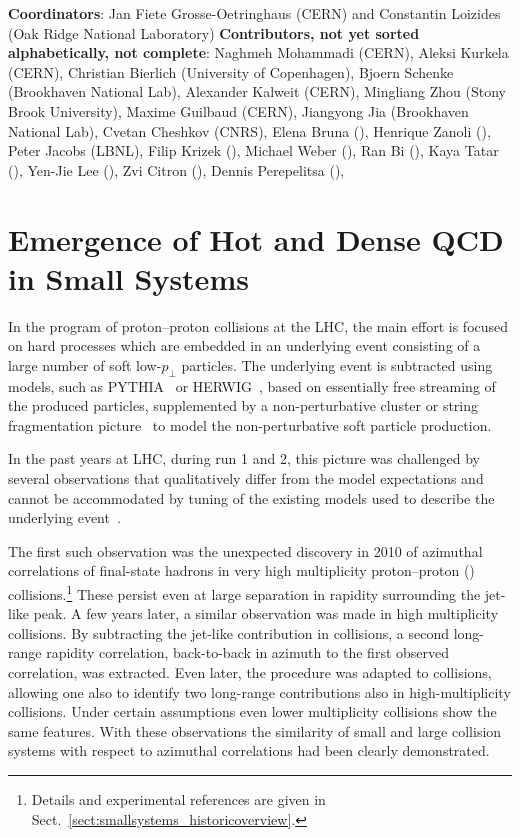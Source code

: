 \documentclass[../report.tex]{subfiles}
\begin{document}
\textbf{Coordinators}: Jan Fiete Grosse-Oetringhaus (CERN) and Constantin Loizides (Oak Ridge National Laboratory)
\linebreak
\textbf{Contributors, not yet sorted alphabetically, not complete}:
Naghmeh Mohammadi (CERN),
Aleksi Kurkela (CERN),
Christian Bierlich (University of Copenhagen),
Bjoern Schenke (Brookhaven National Lab),
Alexander Kalweit (CERN),
Mingliang Zhou (Stony Brook University),
Maxime Guilbaud (CERN),
Jiangyong Jia (Brookhaven National Lab),
Cvetan Cheshkov (CNRS),
Elena Bruna (),
Henrique Zanoli (),
Peter Jacobs (LBNL),
Filip Krizek (),
Michael Weber (),
Ran Bi (),
Kaya Tatar (),
Yen-Jie Lee (),
Zvi Citron (),
Dennis Perepelitsa (),

\label{sec:smallsyst}
\section{Emergence of Hot and Dense QCD in Small Systems}
\label{sect:introduction}
In the program of proton--proton collisions at the LHC, the main effort is focused on hard processes which are embedded in an underlying event consisting of a large number of soft low-$p_\perp$ particles. The underlying event is subtracted using models, such as PYTHIA~\cite{Sjostrand:2014zea} or HERWIG~\cite{Bellm:2015jjp}, based on essentially free streaming of the produced particles, supplemented by a non-perturbative cluster or string fragmentation picture~\cite{Andersson:1983ia,Webber:1983if} to model the non-perturbative soft particle production.

In the past years at LHC, during run 1 and 2, this picture was challenged by several observations that qualitatively differ from the model expectations and cannot be accommodated by tuning of the existing models used to describe the underlying event~\cite{Fischer:2016zzs}.

The first such observation was the unexpected discovery in 2010 of azimuthal correlations of final-state hadrons in very high multiplicity proton--proton (\pp) collisions.\footnote{Details and experimental references are given in Sect.~\ref{sect:smallsystems_historicoverview}.} These persist even at large separation in rapidity surrounding the jet-like peak. A few years later, a similar observation was made in high multiplicity \pPb collisions. By subtracting the jet-like contribution in \pPb collisions, a second long-range rapidity correlation, back-to-back in azimuth to the first observed correlation, was extracted. Even later, the procedure was adapted to \pp collisions, allowing one also to identify two long-range contributions also in high-multiplicity \pp collisions. Under certain assumptions even lower multiplicity \pp collisions show the same features. With these observations the similarity of small and large collision systems with respect to azimuthal correlations had been clearly demonstrated.
\end{document}
